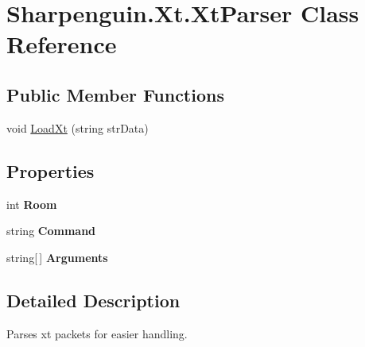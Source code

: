 \hypertarget{classSharpenguin_1_1Xt_1_1XtParser}{\section{\-Sharpenguin.\-Xt.\-Xt\-Parser \-Class \-Reference}
\label{classSharpenguin_1_1Xt_1_1XtParser}
}
\subsection*{\-Public \-Member \-Functions}
\begin{DoxyCompactItemize}
\item 
void \hyperlink{classSharpenguin_1_1Xt_1_1XtParser_a7f2d2d3ca37839e4a0315e8016886f7f}{\-Load\-Xt} (string str\-Data)
\end{DoxyCompactItemize}
\subsection*{\-Properties}
\begin{DoxyCompactItemize}
\item 
\hypertarget{classSharpenguin_1_1Xt_1_1XtParser_a3133f881cf40c91334824bce42ae4fdb}{int {\bfseries \-Room}}\label{classSharpenguin_1_1Xt_1_1XtParser_a3133f881cf40c91334824bce42ae4fdb}

\item 
\hypertarget{classSharpenguin_1_1Xt_1_1XtParser_a6fb17caa59babd67acdcafc397cb563a}{string {\bfseries \-Command}}\label{classSharpenguin_1_1Xt_1_1XtParser_a6fb17caa59babd67acdcafc397cb563a}

\item 
\hypertarget{classSharpenguin_1_1Xt_1_1XtParser_a66f571aaabb838b143969f36ad797f92}{string\mbox{[}$\,$\mbox{]} {\bfseries \-Arguments}}\label{classSharpenguin_1_1Xt_1_1XtParser_a66f571aaabb838b143969f36ad797f92}

\end{DoxyCompactItemize}


\subsection{\-Detailed \-Description}
\-Parses xt packets for easier handling. 

